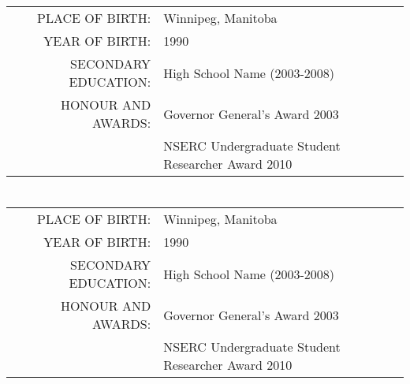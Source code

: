 \section*{\centering \StudentNameE}
\begin{table}[htdp]
\begin{center}
\begin{tabular}{rl}
	PLACE OF BIRTH: 
		& Winnipeg, Manitoba\\
	YEAR OF BIRTH: 
		& 1990 \\
	SECONDARY EDUCATION: 
		& High School Name (2003-2008) \\
	HONOUR AND AWARDS: 
		& Governor General's Award 2003 \\
		& NSERC Undergraduate Student Researcher Award 2010 \\
\end{tabular}
\end{center}
\end{table}

\section*{\centering \StudentNameF}
\begin{table}[htdp]
\begin{center}
\begin{tabular}{rl}
	PLACE OF BIRTH: 
		& Winnipeg, Manitoba\\
	YEAR OF BIRTH: 
		& 1990 \\
	SECONDARY EDUCATION: 
		& High School Name (2003-2008) \\
	HONOUR AND AWARDS: 
		& Governor General's Award 2003 \\
		& NSERC Undergraduate Student Researcher Award 2010 \\
\end{tabular}
\end{center}
\end{table}
